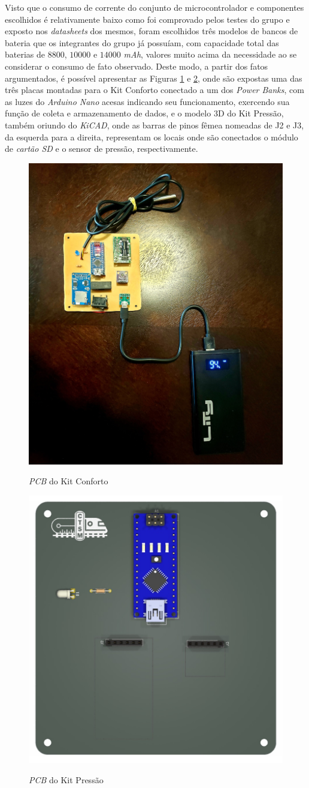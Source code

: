\documentclass[acronym,symbols,table]{fei}
\begin{document}
Visto que o consumo de corrente do conjunto de microcontrolador e componentes escolhidos é relativamente baixo como foi comprovado pelos testes do grupo e exposto nos \textit{datasheets} dos mesmos, foram escolhidos três modelos de bancos de bateria que os integrantes do grupo já possuíam, com capacidade total das baterias de $8800$, $10000$ e $14000$ \textit{mAh}, valores muito acima da necessidade ao se considerar o consumo de fato observado. Deste modo, a partir dos fatos argumentados, é possível apresentar as Figuras \ref{fig:PCB_conforto} e \ref{fig:PCB_Pressao}, onde são expostas uma das três placas montadas para o Kit Conforto conectado a um dos \textit{Power Banks}, com as luzes do \textit{Arduino Nano} acesas indicando seu funcionamento, exercendo sua função de coleta e armazenamento de dados, e o modelo 3D do Kit Pressão, também oriundo do \textit{KiCAD}, onde as barras de pinos fêmea nomeadas de J2 e J3, da esquerda para a direita, representam os locais onde são conectados o módulo de \textit{cartão SD} e o sensor de pressão, respectivamente.

\begin{figure}[!htb]
\centering
    \caption{\textit{PCB} do Kit Conforto}
    \includegraphics[width=0.5\linewidth]{Imagens/PCB_Conforto.jpeg}
    \label{fig:PCB_conforto}
\end{figure}

\begin{figure}[!htb]
\centering
    \caption{\textit{PCB} do Kit Pressão}
    \includegraphics[width=0.4\linewidth]{Imagens/PCB_Pressao.jpg}
    \label{fig:PCB_Pressao}
\end{figure}
\end{document}
